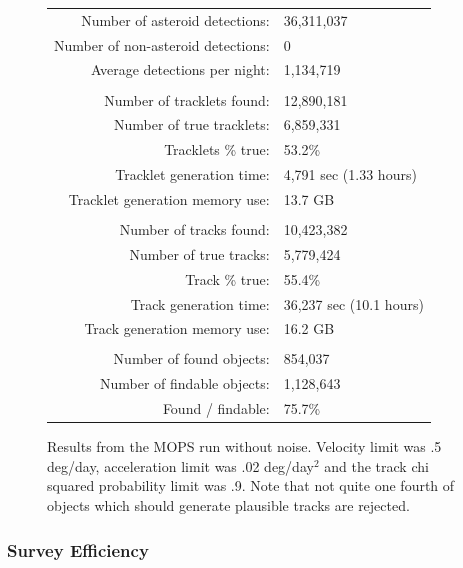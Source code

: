\begin{figure}[ht!]
\centering
\begin{tabular}{|r l|}
\hline
Number of asteroid detections: & 36,311,037 \\
Number of non-asteroid detections: & 0 \\
Average detections per night: & 1,134,719 \\
 & \\
Number of tracklets found: & 12,890,181 \\
Number of true tracklets: & 6,859,331 \\
Tracklets \% true: & 53.2\%\\
Tracklet generation time: & 4,791 sec (1.33 hours) \\
Tracklet generation memory use: & 13.7 GB  \\
 & \\
Number of tracks found: & 10,423,382 \\
Number of true tracks: & 5,779,424 \\
Track \% true: & 55.4\% \\
Track generation time: & 36,237 sec (10.1 hours) \\
Track generation memory use: & 16.2 GB \\
 & \\
Number of found objects: & 854,037 \\
Number of findable objects: & 1,128,643 \\
Found / findable: & 75.7\% \\
\hline
\end{tabular}

\caption[Test runs from MOPS run without noise.]{Results from the MOPS run without noise.  Velocity limit was .5 deg/day, acceleration limit was .02 deg/day$^2$ and the track chi squared probability limit was .9.  Note that not quite one fourth of objects which should generate plausible tracks are rejected.}
\label{oneMonth}
\end{figure}

\subsubsection{Survey Efficiency}

